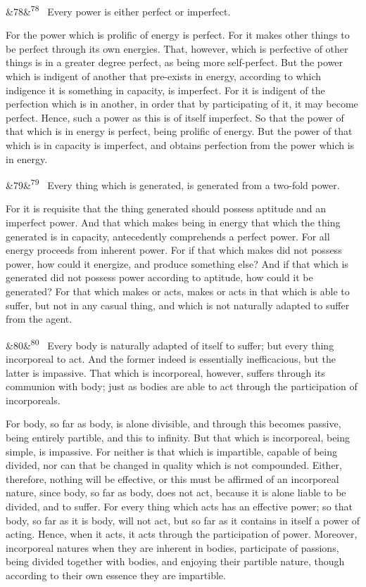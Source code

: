 \documentclass[12pt]{article}
\newcommand{\para}[1][]{\par\noindent\ifx&#1&\else\textsuperscript{\footnotesize #1}~\fi}
\begin{document}
\para[78] Every power is either perfect or imperfect.

For the power which is prolific of energy is perfect. For it makes other things to be perfect through its own energies. That, however, which is perfective of other things is in a greater degree perfect, as being more self-perfect. But the power which is indigent of another that pre-exists in energy, according to which indigence it is something in capacity, is imperfect. For it is indigent of the perfection which is in another, in order that by participating of it, it may become perfect. Hence, such a power as this is of itself imperfect. So that the power of that which is in energy is perfect, being prolific of energy. But the power of that which is in capacity is imperfect, and obtains perfection from the power which is in energy.

\para[79] Every thing which is generated, is generated from a two-fold power.

For it is requisite that the thing generated should possess aptitude and an imperfect power. And that which makes being in energy that which the thing generated is in capacity, antecedently comprehends a perfect power. For all energy proceeds from inherent power. For if that which makes did not possess power, how could it energize, and produce something else? And if that which is generated did not possess power according to aptitude, how could it be generated? For that which makes or acts, makes or acts in that which is able to suffer, but not in any casual thing, and which is not naturally adapted to suffer from the agent.

\para[80] Every body is naturally adapted of itself to suffer; but every thing incorporeal to act. And the former indeed is essentially inefficacious, but the latter is impassive. That which is incorporeal, however, suffers through its communion with body; just as bodies are able to act through the participation of incorporeals.

For body, so far as body, is alone divisible, and through this becomes passive, being entirely partible, and this to infinity. But that which is incorporeal, being simple, is impassive. For neither is that which is impartible, capable of being divided, nor can that be changed in quality which is not compounded. Either, therefore, nothing will be effective, or this must be affirmed of an incorporeal nature, since body, so far as body, does not act, because it is alone liable to be divided, and to suffer. For every thing which acts has an effective power; so that body, so far as it is body, will not act, but so far as it contains in itself a power of acting. Hence, when it acts, it acts through the participation of power. Moreover, incorporeal natures when they are inherent in bodies, participate of passions, being divided together with bodies, and enjoying their partible nature, though according to their own essence they are impartible.
\end{document}
